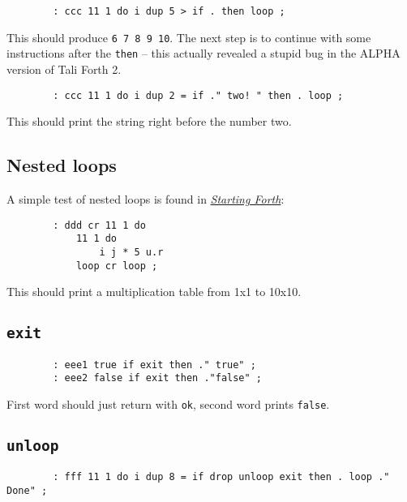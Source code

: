 \begin{lstlisting}
        : ccc 11 1 do i dup 5 > if . then loop ; 
\end{lstlisting}

\noindent This should produce \texttt{6 7 8 9 10}. The next step is to continue
with some instructions after the \texttt{then} -- this actually revealed a
stupid bug in the ALPHA version of Tali Forth 2.

\begin{lstlisting}
        : ccc 11 1 do i dup 2 = if ." two! " then . loop ;
\end{lstlisting}

\noindent This should print the string right before the number two.

\subsection{Nested loops}

\noindent A simple test of nested loops is found in
\href{https://www.forth.com/starting-forth/6-forth-do-loops/}{\textit{Starting
Forth}}:

\begin{lstlisting}
        : ddd cr 11 1 do
            11 1 do 
                i j * 5 u.r 
            loop cr loop ;
\end{lstlisting}

\noindent This should print a multiplication table from 1x1 to 10x10.

\subsection{\texttt{exit}}

\begin{lstlisting}
        : eee1 true if exit then ." true" ; 
        : eee2 false if exit then ."false" ; 
\end{lstlisting}

\noindent First word should just return with \texttt{ok}, second word prints \texttt{false}.


\subsection{\texttt{unloop}}

\begin{lstlisting}
        : fff 11 1 do i dup 8 = if drop unloop exit then . loop ." Done" ; 
\end{lstlisting}

